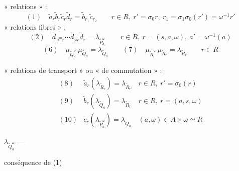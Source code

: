 \documentclass[11pt,a4paper]{article}
\begin{document}
« relations \ill{} » :
\[
(1)\quad \tilde a_r \tilde b_r \tilde c_r \tilde d_r = \tilde b_{r_1} \tilde c_{r_2}
\qquad r\in R,\ r' = \sigma_0 r,\ r_1 = \sigma_1\sigma_0(r') = \omega^{-1} r'
\]
« relations fibres » :
\[
(2)\quad \tilde d_{\omega^m r}\cdots \tilde d_{\omega r}\tilde d_r = \lambda_{\widetilde{P}^\omega_{a_1}}
\qquad r\in R,\ r = (s,a,\omega),\ a' = \omega^{-1}(a)
\]
\[
(6)\quad \mu_{\widetilde{Q}_a^\vee}\,\mu_{\widetilde{Q}_a} = \lambda_{\widetilde{Q}_a}
\qquad (7)\quad \mu_{\widetilde{R}_r^\vee}\,\mu_{\widetilde{R}_r} = \lambda_{\widetilde{R}_r}
\qquad r\in R
\]

« relations de transport » ou « de commutation » :
\[
\begin{array}{lll}
(8) & \tilde a_r(\lambda_{\widetilde{R}_r}) = \lambda_{\widetilde{R}_{r'}} & r\in R,\ r' = \sigma_0(r)\\
(9) & \tilde b_r(\lambda_{\widetilde{Q}_a}) = \lambda_{\widetilde{R}_r} & r\in R,\ r = (a,s,\omega)\\
(10) & \tilde c_r(\lambda_{\widetilde{P}^\omega_a}) = \lambda_{\widetilde{Q}_a} & (a,\omega)\in A\times\underline{\omega}\simeq R
\end{array}
\]

 \quad $\lambda_{\widetilde{Q}^\omega_a}$ — 

\quad conséquence de (1)
\end{document}
